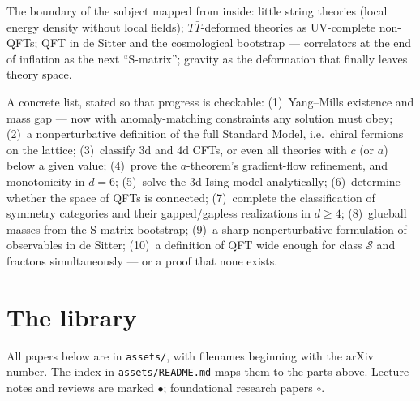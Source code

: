 The boundary of the subject mapped from inside: little string theories (local energy density without local fields); $T\bar T$-deformed theories as UV-complete non-QFTs; QFT in de Sitter and the cosmological bootstrap --- correlators at the end of inflation as the next ``S-matrix''; gravity as the deformation that finally leaves theory space.

A concrete list, stated so that progress is checkable: (1)~Yang--Mills existence and mass gap --- now with anomaly-matching constraints any solution must obey; (2)~a nonperturbative definition of the full Standard Model, i.e.\ chiral fermions on the lattice; (3)~classify 3d and 4d CFTs, or even all theories with $c$ (or $a$) below a given value; (4)~prove the $a$-theorem's gradient-flow refinement, and monotonicity in $d=6$; (5)~solve the 3d Ising model analytically; (6)~determine whether the space of QFTs is connected; (7)~complete the classification of symmetry categories and their gapped/gapless realizations in $d \ge 4$; (8)~glueball masses from the S-matrix bootstrap; (9)~a sharp nonperturbative formulation of observables in de Sitter; (10)~a definition of QFT wide enough for class $\mathcal{S}$ and fractons simultaneously --- or a proof that none exists.

\newpage

{}
\section*{The library}
\sloppy %

\noin All papers below are in \texttt{assets/}, with filenames beginning with the arXiv number. The index in \texttt{assets/README.md} maps them to the parts above. Lecture notes and reviews are marked $\bullet$; foundational research papers $\circ$.

